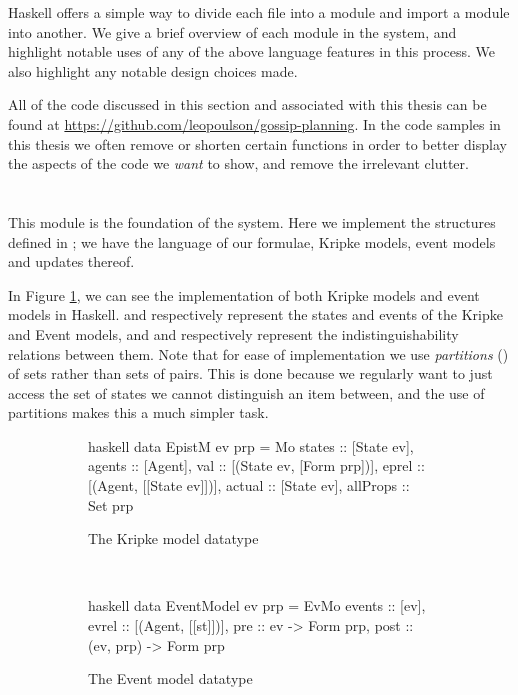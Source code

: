 \documentclass[10pt, a4paper]{report}
\begin{document}
Haskell offers a simple way to divide each file into a module and import a
module into another. We give a brief overview of each module in the system, and
highlight notable uses of any of the above language features in this process. We
also highlight any notable design choices made.

All of the code discussed in this section and associated with this thesis can be
found at \url{https://github.com/leopoulson/gossip-planning}. In the code
samples in this thesis we often remove or shorten certain functions in order to
better display the aspects of the code we \emph{want} to show, and remove the
irrelevant clutter. 

\section{}

This module is the foundation of the system. Here we implement the structures
defined in ; we have the language of our formulae, Kripke
models, event models and updates thereof.

In Figure \ref{fig:HaskellModels}, we can see the implementation of both Kripke
models and event models in Haskell.  and 
respectively represent the states and events of the Kripke and Event models, and
 and  respectively represent the
indistinguishability relations between them. Note that for ease of
implementation we use \emph{partitions} (\cite{EREL}) of sets rather than sets
of pairs. This is done because we regularly want to just access the set of
states we cannot distinguish an item between, and the use of partitions makes
this a much simpler task. 

\begin{figure}[h]
  \begin{subfigure}[b]{0.5\textwidth}
    \begin{cminted}{haskell}
      data EpistM ev prp = Mo {
        states :: [State ev],                  
        agents :: [Agent],              
        val :: [(State ev, [Form prp])],         
        eprel :: [(Agent, [[State ev]])],
        actual :: [State ev],              
        allProps :: Set prp
      }
    \end{cminted}
    \caption{The Kripke model datatype}
  \end{subfigure}%
~
  \begin{subfigure}[b]{0.5\textwidth}
    \begin{cminted}{haskell}
      data EventModel ev prp = EvMo {
        events :: [ev],
        evrel :: [(Agent, [[st]])],
        pre :: ev -> Form prp,
        post :: (ev, prp) -> Form prp
      }
    \end{cminted}
    \caption{The Event model datatype}
  \end{subfigure}
  \caption{}
  \label{fig:HaskellModels}
\end{figure}
\end{document}
